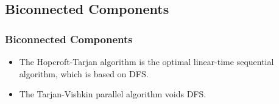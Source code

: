 \subsection{Biconnected Components}
\begin{frame}
	\frametitle{Biconnected Components}
	\begin{itemize}
		\setlength\itemsep{1em}
		\item The Hopcroft-Tarjan algorithm is the optimal linear-time sequential algorithm, which is based on DFS.
		\item The Tarjan-Vishkin parallel algorithm voids DFS.
	\end{itemize}
\end{frame}

